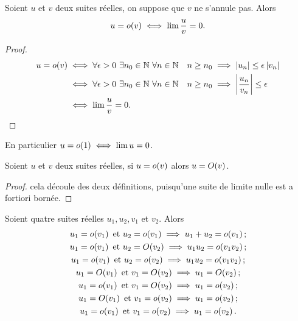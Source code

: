\begin{prop}
  Soient $u$ et $v$ deux suites réelles, on suppose que $v$ ne s'annule pas. Alors
  \begin{equation}
    u=o\mathopen{}\left(v\right) \iff \lim \frac{u}{v}=0.
  \end{equation}
\end{prop}
\begin{proof}
  \begin{align}
    u=o\mathopen{}\left(v\right) & \iff \forall \epsilon > 0 \ \exists n_0 \in \mathbb{N} \ \forall n \in \mathbb{N} \quad n \geq n_0 \implies \left\lvert u_n\right\rvert \leq \epsilon \left\lvert v_n\right\rvert \\
    & \iff \forall \epsilon > 0 \ \exists n_0 \in \mathbb{N} \ \forall n \in \mathbb{N} \quad n \geq n_0 \implies \left\lvert\frac{u_n}{v_n}\right\rvert \leq \epsilon \\
    & \iff \lim \frac{u}{v} =0.
  \end{align}
\end{proof}
En particulier $u=o\mathopen{}\left(1\right) \iff \lim u =0$.
\begin{prop}
  Soient $u$ et $v$ deux suites réelles, si $u=o\mathopen{}\left(v\right)$ alors $u=O\mathopen{}\left(v\right)$.
\end{prop}
\begin{proof}
  cela découle des deux définitions, puisqu'une suite de limite nulle est a fortiori bornée.
\end{proof}
\begin{prop}
  Soient quatre suites réelles $u_1, u_2, v_1$ et $v_2$. Alors
  \begin{gather}
    u_1=o\mathopen{}\left(v_1\right)\text{~et~}u_2=o\mathopen{}\left(v_1\right)\implies u_1+u_2=o\mathopen{}\left(v_1\right);\\
    u_1=o\mathopen{}\left(v_1\right)\text{~et~}u_2=O\mathopen{}\left(v_2\right)\implies u_1u_2=o\mathopen{}\left(v_1 v_2\right);\\
    u_1=o\mathopen{}\left(v_1\right)\text{~et~}u_2=o\mathopen{}\left(v_2\right)\implies u_1u_2=o\mathopen{}\left(v_1 v_2\right);\\
    u_1=O\mathopen{}\left(v_1\right)\text{~et~}v_1=O\mathopen{}\left(v_2\right)\implies u_1=O\mathopen{}\left(v_2\right);\\
    u_1=o\mathopen{}\left(v_1\right)\text{~et~}v_1=O\mathopen{}\left(v_2\right)\implies u_1=o\mathopen{}\left(v_2\right);\\
    u_1=O\mathopen{}\left(v_1\right)\text{~et~}v_1=o\mathopen{}\left(v_2\right)\implies u_1=o\mathopen{}\left(v_2\right);\\
    u_1=o\mathopen{}\left(v_1\right)\text{~et~}v_1=o\mathopen{}\left(v_2\right)\implies u_1=o\mathopen{}\left(v_2\right).
  \end{gather}
\end{prop}
